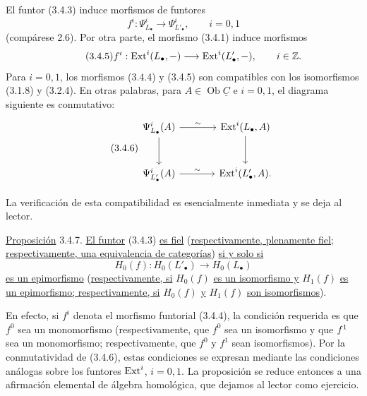 El funtor (3.4.3) induce morfismos de funtores
\begin{equation}\tag{3.4.4}
 f^i:\Psi^i_{L_\bullet}\longrightarrow\Psi^i_{L'_\bullet},
 \qquad i=0,1
\end{equation}
(compárese 2.6). Por otra parte, el morfismo (3.4.1) induce morfismos
\begin{equation}\tag{3.4.5}
 f^i:\operatorname{Ext}^i(L_\bullet,-)\longrightarrow
 \operatorname{Ext}^i(L'_\bullet,-),\qquad i\in\mathbb Z.
\end{equation}
Para $i=0,1$, los morfismos (3.4.4) y (3.4.5) son compatibles con los
isomorfismos (3.1.8) y (3.2.4). En otras palabras, para
$A\in\operatorname{Ob}\underline C$ e $i=0,1$, el diagrama siguiente
es conmutativo:
\begin{equation}\tag{3.4.6}
\begin{tikzcd}[column sep=large,row sep=large]
 \Psi^i_{L_\bullet}(A)\arrow[r,"\sim"]\arrow[d]
 &\Ext^i(L_\bullet,A)\arrow[d]\\
 \Psi^i_{L'_\bullet}(A)\arrow[r,"\sim"]
 &\Ext^i(L'_\bullet,A).
\end{tikzcd}
\end{equation}


La verificación de esta compatibilidad es esencialmente inmediata y se
deja al lector.

\underline{Proposición} 3.4.7. \underline{El funtor} (3.4.3)
\underline{es fiel} (\underline{respectivamente, plenamente fiel;
respectivamente, una equivalencia de categorías}) \underline{si y
solo si}
\[
 H_0(f):H_0(L'_\bullet)\longrightarrow H_0(L_\bullet)
\]
\underline{es un epimorfismo} (\underline{respectivamente, si}
$H_0(f)$ \underline{es un isomorfismo y} $H_1(f)$
\underline{es un epimorfismo; respectivamente, si} $H_0(f)$
\underline{y} $H_1(f)$ \underline{son isomorfismos}).

En efecto, si $f^i$ denota el morfismo funtorial (3.4.4), la condición
requerida es que $f^0$ sea un monomorfismo (respectivamente, que $f^0$
sea un isomorfismo y que $f^1$ sea un monomorfismo;
respectivamente, que $f^0$ y $f^1$ sean isomorfismos). Por la
conmutatividad de (3.4.6), estas condiciones se expresan mediante las
condiciones análogas sobre los funtores $\operatorname{Ext}^i$, $i=0,1$. La
proposición se reduce entonces a una afirmación elemental de álgebra
homológica, que dejamos al lector como ejercicio.
